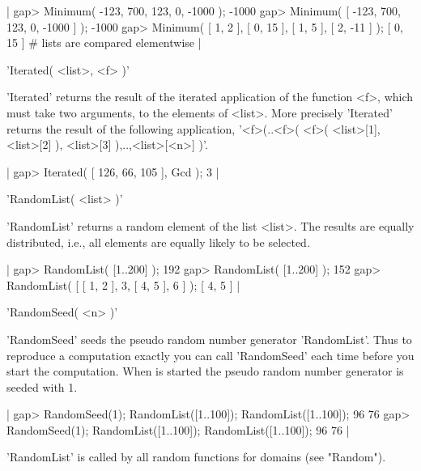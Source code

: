 |    gap> Minimum( -123, 700, 123, 0, -1000 );
    -1000
    gap> Minimum( [ -123, 700, 123, 0, -1000 ] );
    -1000
    gap> Minimum( [ 1, 2 ], [ 0, 15 ], [ 1, 5 ], [ 2, -11 ] );
    [ 0, 15 ]        # lists are compared elementwise |

%

'Iterated( <list>, <f> )'

'Iterated' returns the result of the iterated application of the function
<f>,  which must take  two arguments,  to the  elements of  <list>.  More
precisely  'Iterated' returns the  result of the  following  application,
'<f>(..<f>( <f>( <list>[1], <list>[2] ), <list>[3] ),..,<list>[<n>] )'.

|    gap> Iterated( [ 126, 66, 105 ], Gcd );
    3 |


'RandomList( <list> )'

'RandomList' returns a  random element of  the list <list>.   The results
are equally distributed,  i.e.,  all elements are  equally  likely  to be
selected.

|    gap> RandomList( [1..200] );
    192
    gap> RandomList( [1..200] );
    152
    gap> RandomList( [ [ 1, 2 ], 3, [ 4, 5 ], 6 ] );
    [ 4, 5 ] |

'RandomSeed( <n> )'%

'RandomSeed' seeds the pseudo random number generator 'RandomList'.  Thus
to reproduce a computation  exactly   you can call 'RandomSeed' each time
before you  start  the computation.   When {\GAP} is started   the pseudo
random number generator is seeded with 1.

|    gap> RandomSeed(1);  RandomList([1..100]);  RandomList([1..100]);
    96
    76
    gap> RandomSeed(1);  RandomList([1..100]);  RandomList([1..100]);
    96
    76 |

'RandomList'  is   called  by  all  random    functions for domains  (see
"Random").




